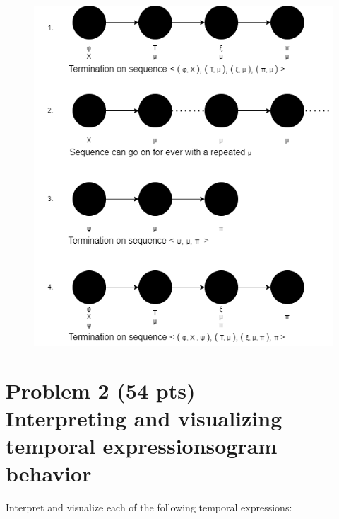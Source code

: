 \documentclass[12pt]{article}
\begin{document}
\begin{figure}[ht]
\includegraphics[scale=0.725]{p1.png}
\end{figure}
\newpage

\section{Problem 2 (54 pts) \\Interpreting and visualizing temporal expressionsogram behavior}

Interpret and visualize each of the following temporal expressions:
\end{document}
